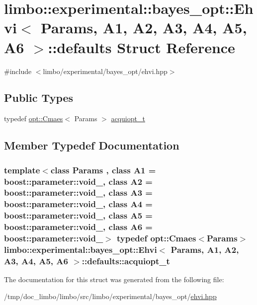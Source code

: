 \hypertarget{structlimbo_1_1experimental_1_1bayes__opt_1_1_ehvi_1_1defaults}{}\section{limbo\+:\+:experimental\+:\+:bayes\+\_\+opt\+:\+:Ehvi$<$ Params, A1, A2, A3, A4, A5, A6 $>$\+:\+:defaults Struct Reference}
\label{structlimbo_1_1experimental_1_1bayes__opt_1_1_ehvi_1_1defaults}


{\ttfamily \#include $<$limbo/experimental/bayes\+\_\+opt/ehvi.\+hpp$>$}

\subsection*{Public Types}
\begin{DoxyCompactItemize}
\item 
typedef \hyperlink{structlimbo_1_1opt_1_1_cmaes}{opt\+::\+Cmaes}$<$ Params $>$ \hyperlink{structlimbo_1_1experimental_1_1bayes__opt_1_1_ehvi_1_1defaults_a3de3f3a53d396b50e0358661f122d450}{acquiopt\+\_\+t}
\end{DoxyCompactItemize}


\subsection{Member Typedef Documentation}
\hypertarget{structlimbo_1_1experimental_1_1bayes__opt_1_1_ehvi_1_1defaults_a3de3f3a53d396b50e0358661f122d450}{}
\subsubsection[{acquiopt\+\_\+t}]{\setlength{\rightskip}{0pt plus 5cm}template$<$class Params , class A1  = boost\+::parameter\+::void\+\_\+, class A2  = boost\+::parameter\+::void\+\_\+, class A3  = boost\+::parameter\+::void\+\_\+, class A4  = boost\+::parameter\+::void\+\_\+, class A5  = boost\+::parameter\+::void\+\_\+, class A6  = boost\+::parameter\+::void\+\_\+$>$ typedef {\bf opt\+::\+Cmaes}$<$Params$>$ {\bf limbo\+::experimental\+::bayes\+\_\+opt\+::\+Ehvi}$<$ Params, A1, A2, A3, A4, A5, A6 $>$\+::{\bf defaults\+::acquiopt\+\_\+t}}\label{structlimbo_1_1experimental_1_1bayes__opt_1_1_ehvi_1_1defaults_a3de3f3a53d396b50e0358661f122d450}


The documentation for this struct was generated from the following file\+:\begin{DoxyCompactItemize}
\item 
/tmp/doc\+\_\+limbo/limbo/src/limbo/experimental/bayes\+\_\+opt/\hyperlink{bayes__opt_2ehvi_8hpp}{ehvi.\+hpp}\end{DoxyCompactItemize}
